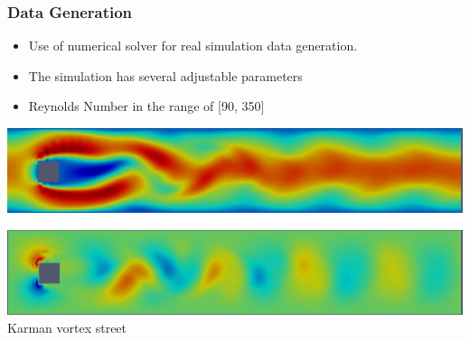 \documentclass[18pt]{beamer}
\begin{document}
\begin{frame}[t]
  \frametitle{Data Generation}
  \begin{itemize}
  \item Use of numerical solver for real simulation data generation.
  \item The simulation has several adjustable parameters
  \item Reynolds Number in the range of [90, 350]
  \end{itemize}
  \begin{center}
    \includegraphics[scale=0.21]{images/x-direction}
  \end{center}
  \begin{center}
    \includegraphics[scale=0.21]{images/y-direction} \\
    \caption{Karman vortex street}
  \end{center}
\end{frame}
\end{document}
